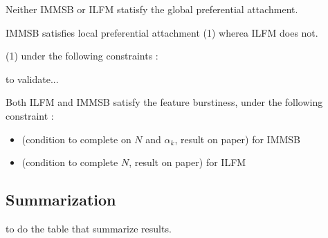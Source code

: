 \begin{proposition}\label{th:gdegree_mg}
    Neither IMMSB or ILFM statisfy the global preferential attachment.
\end{proposition}

\begin{proposition}\label{th:ldegree_mg}
    IMMSB satisfies local preferential attachment (1) wherea ILFM does not.

    (1) under the following constraints :

    to validate...
    
\end{proposition}

\begin{proposition}\label{th:feature_mg}
    Both ILFM and IMMSB satisfy the feature burstiness, under the following constraint :
    \begin{itemize}
        \item (condition to complete on $N$ and $\alpha_k$, result on paper) for IMMSB
        \item (condition to complete $N$, result on paper) for ILFM
    \end{itemize}
\item 
\end{proposition}


\subsection{Summarization}

to do the table that summarize results.
